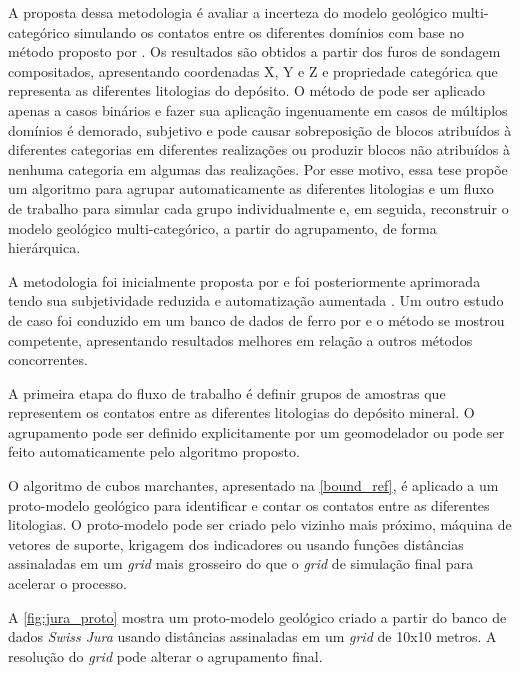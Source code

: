 A proposta dessa metodologia é avaliar a incerteza do modelo geológico multi-categórico simulando os contatos entre os diferentes domínios com base no método proposto por . Os resultados são obtidos a partir dos furos de sondagem compositados, apresentando coordenadas X, Y e Z e propriedade categórica que representa as diferentes litologias do depósito. O método de  pode ser aplicado apenas a casos binários e fazer sua aplicação ingenuamente em casos de múltiplos domínios é demorado, subjetivo e pode causar sobreposição de blocos atribuídos à diferentes categorias em diferentes realizações ou produzir blocos não atribuídos à nenhuma categoria em algumas das realizações. Por esse motivo, essa tese propõe um algoritmo para agrupar automaticamente as diferentes litologias e um fluxo de trabalho para simular cada grupo individualmente e, em seguida, reconstruir o modelo geológico multi-categórico, a partir do agrupamento, de forma hierárquica.

A metodologia foi inicialmente proposta por  e foi posteriormente aprimorada tendo sua subjetividade reduzida e automatização aumentada \cite{amarante2021boundary}. Um outro estudo de caso foi conduzido em um banco de dados de ferro por  e o método se mostrou competente, apresentando resultados melhores em relação a outros métodos concorrentes.

A primeira etapa do fluxo de trabalho é definir grupos de amostras que representem os contatos entre as diferentes litologias do depósito mineral. O agrupamento pode ser definido explicitamente por um geomodelador ou pode ser feito automaticamente pelo algoritmo proposto.

O algoritmo de cubos marchantes, apresentado na \autoref{bound_ref}, é aplicado a um proto-modelo geológico para identificar e contar os contatos entre as diferentes litologias. O proto-modelo pode ser criado pelo vizinho mais próximo, máquina de vetores de suporte, krigagem dos indicadores ou usando funções distâncias assinaladas em um \textit{grid} mais grosseiro do que o \textit{grid} de simulação final para acelerar o processo.

A \autoref{fig:jura_proto} mostra um proto-modelo geológico criado a partir do banco de dados \textit{Swiss Jura} usando distâncias assinaladas em um \textit{grid} de 10x10 metros. A resolução do \textit{grid} pode alterar o agrupamento final.

